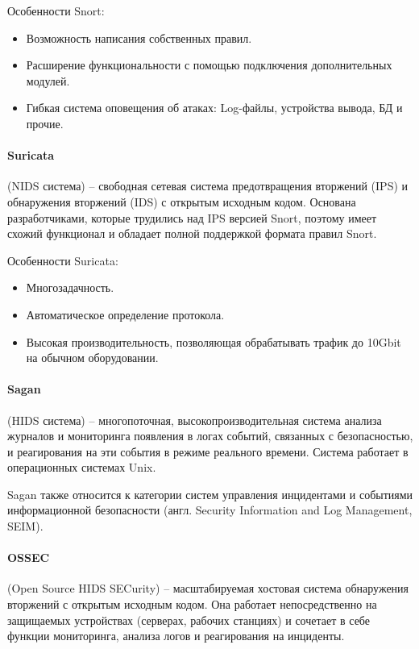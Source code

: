 Особенности Snort:
\begin{itemize}
	\item Возможность написания собственных правил.
	\item Расширение функциональности с помощью подключения дополнительных модулей.
	\item Гибкая система оповещения об атаках: Log-файлы, устройства вывода, БД и прочие.
\end{itemize}


\paragraph*{Suricata} (NIDS система) -- свободная сетевая система предотвращения вторжений
(IPS) и обнаружения вторжений (IDS) с открытым исходным кодом. Основана разработчиками,
которые трудились над IPS версией Snort, поэтому имеет схожий функционал и обладает полной
поддержкой формата правил Snort.

Особенности Suricata:
\begin{itemize}
	\item Многозадачность.

	\item Автоматическое определение протокола.

	\item Высокая производительность, позволяющая обрабатывать трафик до 10Gbit на обычном
	оборудовании.
\end{itemize}


\paragraph*{Sagan} (HIDS система) -- многопоточная, высокопроизводительная система
анализа журналов и мониторинга появления в логах событий, связанных с безопасностью,
и реагирования на эти события в режиме реального времени. Система работает в операционных
системах Unix.

Sagan также относится к категории систем управления инцидентами и событиями информационной
безопасности (англ. Security Information and Log Management, SEIM).

\paragraph*{OSSEC} (Open Source HIDS SECurity) -- масштабируемая хостовая система обнаружения вторжений с открытым исходным кодом.
Она работает непосредственно на защищаемых устройствах (серверах, рабочих станциях) и сочетает в себе функции мониторинга, анализа логов и реагирования на инциденты.

